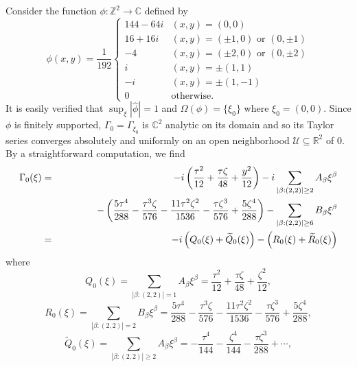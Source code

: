 \documentclass[11pt, letter]{book}
\newenvironment{example}
  {\pushQED{\qed}\renewcommand{\qedsymbol}{$\triangle$}\examplex}
  {\popQED\endexamplex}
\newcommand{\lp}{\left(}
\newcommand{\rp}{\right)}
\newcommand{\f}[2]{\frac{#1}{#2}}
\begin{document}
\begin{example}\normalfont
Consider the function $\phi : \mathbb{Z}^2 \to \mathbb{C}$ defined by 
\begin{equation*}
    \phi(x,y) =
    \frac{1}{192}
    \begin{cases}
    144 - 64i &(x,y) = (0,0)\\
    16 + 16i &(x,y) = (\pm 1, 0)\mbox{ or }(0,\pm 1)\\
    -4        &(x,y) = (\pm 2,0)\mbox{ or }(0,\pm 2)\\
    i   &(x,y) = \pm(1,1)\\
    -i   &(x,y) = \pm(1,-1)\\
    0& \text{otherwise}.
    \end{cases}
\end{equation*}
It is easily verified that $\sup_{\xi}|\widehat{\phi}|=1$ and $\Omega(\phi) = \{\xi_0 \}$ where $\xi_0=(0,0)$. Since $\phi$ is finitely supported, $\Gamma_{0}=\Gamma_{\xi_0}$ is $\mathbb{C}^2$ analytic on its domain and so its Taylor series converges absolutely and uniformly on an open neighborhood $\mathcal{U}\subseteq \mathbb{R}^2$ of $0$. By a straightforward computation, we find
\begin{eqnarray*}
\Gamma_{0}(\xi)
&=& 
-i\lp \frac{\tau^2}{12} +\frac{\tau\zeta}{48} + \frac{y^2}{12}   \rp
-i \sum_{|\beta:(2,2)|\geq 2}A_\beta \xi^\beta\\
&& 
\hspace{1.3cm}-\lp \frac{5\tau^4}{288} -\f{\tau^3\zeta}{576} -\frac{11\tau^2\zeta^2}{1536}-\frac{\tau\zeta^3}{576} + \frac{5\zeta^4}{288}  \rp 
- \sum_{|\beta:(2,2)|\geq 6}B_\beta \xi^\beta\\
&=&-i\lp Q_{0}(\xi)+\widetilde{Q}_{0}(\xi)\rp-\lp R_0(\xi)+\widetilde{R}_0(\xi)\rp
\end{eqnarray*}
where
\begin{equation*}
Q_{0}(\xi)=\sum_{|\beta:(2,2)|=1}A_\beta \xi^\beta=\frac{\tau^2}{12} +\frac{\tau\zeta}{48} + \frac{\zeta^2}{12},
\end{equation*}
\begin{equation*}
R_{0}(\xi)=\sum_{|\beta:(2,2)|=2}B_\beta\xi^\beta
= \frac{5\tau^4}{288} -\f{\tau^3\zeta}{576} -\frac{11\tau^2\zeta^2}{1536}-\frac{\tau\zeta^3}{576} + \frac{5\zeta^4}{288}, 
\end{equation*}
\begin{equation*}
\widetilde{Q}_{0}(\xi)= \sum_{|\beta:(2,2)|\geq 2}A_\beta \xi^\beta= - \frac{\tau^4}{144}  - \frac{\zeta^4}{144} - \frac{\tau\zeta^3}{288} + \cdots, 

\end{equation*}
\end{example}
\end{document}
